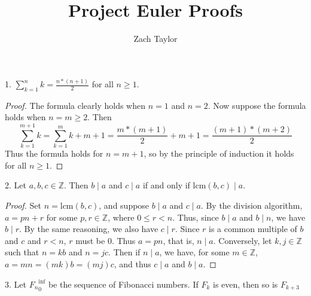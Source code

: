 \documentclass[12pt]{article}
\newcommand{\Z}{\mathbb{Z}}
\begin{document}
\title{Project Euler Proofs}
\author{Zach Taylor}
\maketitle

1. $\sum_{k=1}^n{k} = \frac{n*(n+1)}{2}$ for all $n \geq 1$.
\begin{proof}
  The formula clearly holds when $n=1$ and $n=2$. Now suppose the formula holds 
  when $n = m \geq 2$. Then 
  $$\sum_{k=1}^{m+1}{k} = \sum_{k=1}^m{k} + m + 1 = \frac{m*(m+1)}{2} + m + 1
  = \frac{(m+1)*(m+2)}{2}$$
  Thus the formula holds for $n = m + 1$, so by the principle of induction it holds 
  for all $n \geq 1$.
\end{proof}
\bigbreak

2. Let $a, b, c \in \Z$. Then $b \mid a$ and $c \mid a$ if and only if 
$\text{lcm}(b, c) \mid a$.
\begin{proof}
  Set $n = \text{lcm}(b, c)$, and suppose $b \mid a$ and $c \mid a$. By the 
  division algorithm, $a = pn + r$ for some $p,r \in \Z$, where $0 \leq r < n$. 
  Thus, since $b \mid a$ and $b \mid n$, we have $b \mid r$. By the same reasoning, we
  also have $c \mid r$. Since $r$ is a common multiple of $b$ and $c$ and $r < n$,
  $r$ must be $0$. Thus $a = pn$, that is, $n \mid a$.
  Conversely, let $k, j \in \Z$ such that $n = kb$ and $n = jc$. Then if
  $n \mid a$, we have, for some $m \in \Z$, $a = mn = (mk)b = (mj)c$, and thus
  $c \mid a$ and $b \mid a$.
\end{proof}
\bigbreak

3. Let ${F_n}_0^\inf$ be the sequence of Fibonacci numbers. If $F_k$ is even, then
so is $F_{k+3}$
\end{document}

